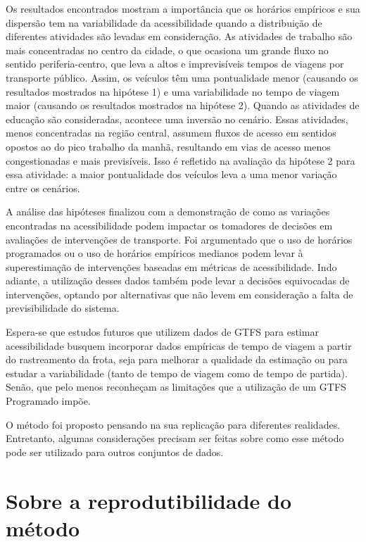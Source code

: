 \documentclass[        
    a4paper,          %
    12pt,             %
    chapter=TITLE,    %
    section=Title,    %
    subsection=Title, %
    oneside,          %
    english,          %
    spanish,          %
    brazil,           %
    fleqn             %
]{abntex2}
\begin{document}
  Os resultados encontrados mostram a importância que os horários empíricos e sua dispersão tem na variabilidade da acessibilidade quando a distribuição de diferentes atividades são levadas em consideração. As atividades de trabalho são mais concentradas no centro da cidade, o que ocasiona um grande fluxo no sentido periferia-centro, que leva a altos e imprevisíveis tempos de viagens por transporte público. Assim, os veículos têm uma pontualidade menor (causando os resultados mostrados na hipótese 1) e uma variabilidade no tempo de viagem maior (causando os resultados mostrados na hipótese 2). Quando as atividades de educação são consideradas, acontece uma inversão no cenário. Essas atividades, menos concentradas na região central, assumem fluxos de acesso em sentidos opostos ao do pico trabalho da manhã, resultando em vias de acesso menos congestionadas e mais previsíveis. Isso é refletido na avaliação da hipótese 2 para essa atividade: a maior pontualidade dos veículos leva a uma menor variação entre os cenários.
  
  A análise das hipóteses finalizou com a demonstração de como as variações encontradas na acessibilidade podem impactar os tomadores de decisões em avaliações de intervenções de transporte. Foi argumentado que o uso de horários programados ou o uso de horários empíricos medianos podem levar à superestimação de intervenções baseadas em métricas de acessibilidade. Indo adiante, a utilização desses dados também pode levar a decisões equivocadas de intervenções, optando por alternativas que não levem em consideração a falta de previsibilidade do sistema.
  
  Espera-se que estudos futuros que utilizem dados de GTFS para estimar acessibilidade busquem incorporar dados empíricas de tempo de viagem a partir do rastreamento da frota, seja para melhorar a qualidade da estimação ou para estudar a variabilidade (tanto de tempo de viagem como de tempo de partida). Senão, que pelo menos reconheçam as limitações que a utilização de um GTFS Programado impõe.
  
  O método foi proposto pensando na sua replicação para diferentes realidades. Entretanto, algumas considerações precisam ser feitas sobre como esse método pode ser utilizado para outros conjuntos de dados.
  
  \hypertarget{sobre-a-reprodutibilidade-do-metodo}{%
  \section{Sobre a reprodutibilidade do método}\label{sobre-a-reprodutibilidade-do-metodo}}
  
\end{document}
